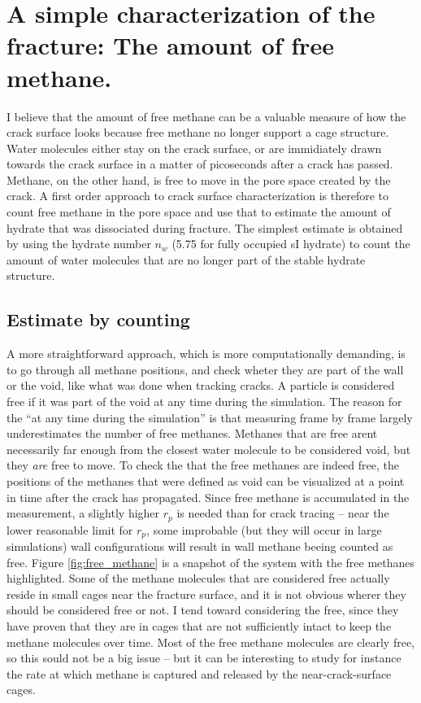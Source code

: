 \section{A simple characterization of the fracture: The amount of free methane.}
I believe that the amount of free methane can be a valuable measure of how the crack surface looks because free methane no longer support a cage structure. Water molecules either stay on the crack surface, or are immidiately drawn towards the crack surface in a matter of picoseconds after a crack has passed. Methane, on the other hand, is free to move in the pore space created by the crack. A first order approach to crack surface characterization is therefore to count free methane in the pore space and use that to estimate the amount of hydrate that was dissociated during fracture. The simplest estimate is obtained by using the hydrate number $n_w$ (5.75 for fully occupied sI hydrate) to count the amount of water molecules that are no longer part of the stable hydrate structure. 


\subsection{Estimate by counting}
\label{sec:freemethane_counting}
A more straightforward approach, which is more computationally demanding, is to go through all methane positions, and check wheter they are part of the wall or the void, like what was done when tracking cracks. A particle is considered free if it was part of the void at any time during the simulation. The reason for the ``at any time during the simulation'' is that measuring frame by frame largely underestimates the number of free methanes. Methanes that are free arent necessarily far enough from the closest water molecule to be considered void, but they \emph{are} free to move. To check the that the free methanes are indeed free, the positions of the methanes that were defined as void can be visualized at a point in time after the crack has propagated. Since free methane is accumulated in the measurement, a slightly higher $r_p$ is needed than for crack tracing -- near the lower reasonable limit for $r_p$, some improbable (but they will occur in large simulations) wall configurations will result in wall methane beeing counted as free. Figure \ref{fig:free_methane} is a snapshot of the system with the free methanes highlighted. Some of the methane molecules that are considered free actually reside in small cages near the fracture surface, and it is not obvious wherer they should be considered free or not. I tend toward considering the free, since they have proven that they are in cages that are not sufficiently intact to keep the methane molecules over time. Most of the free methane molecules are clearly free, so this sould not be a big issue -- but it can be interesting to study for instance the rate at which methane is captured and released by the near-crack-surface cages.

